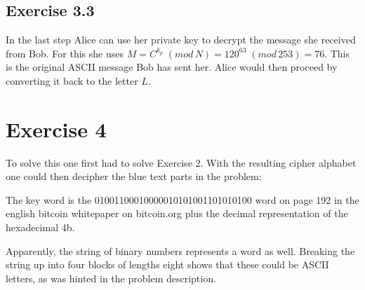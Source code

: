 \documentclass[12pt]{article}
\begin{document}
\subsection*{Exercise 3.3}

In the last step Alice can use her private key to decrypt the message she received from Bob. For this she uses $M = C^{k_p}\;(mod\, N) = 120^{63}\;(mod\, 253) = 76$. This is the original ASCII message Bob has sent her. Alice would then proceed by converting it back to the letter $L$.


\newpage
\section*{Exercise 4}
\label{sec:bonusPoint}

To solve this one first had to solve Exercise 2. With the resulting cipher alphabet one could then decipher the blue text parts in the problem:\par

The key word is the 01001100010000010101001101010100 word on page 192 in the english bitcoin whitepaper on bitcoin.org plus the decimal representation of the hexadecimal 4b.\par


Apparently, the string of binary numbers represents a word as well. Breaking the string up into four blocks of lengths eight shows that these could be ASCII letters, as was hinted in the problem description.\par
\end{document}
